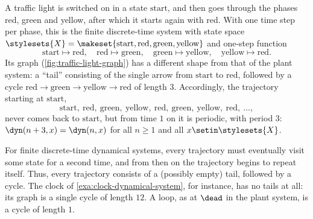 \begin{example}
    \label{exa:traffic-light}
    \begin{marginfigure}
        \centering
        \caption{The graph of the one-step function of the traffic light (\cref{exa:traffic-light}).}
        \label{fig:traffic-light-graph}
    \end{marginfigure}
    A traffic light is switched on in a state $\text{start}$, and then goes through the phases red, green and yellow, after which it starts again with red.
    With one time step per phase, this is the finite discrete-time system with state space $\stylesets{X} = \makeset{\text{start}, \text{red}, \text{green}, \text{yellow}}$ and one-step function
    \begin{equation}
        \text{start} \mapsto \text{red}, \quad \text{red} \mapsto \text{green}, \quad \text{green} \mapsto \text{yellow}, \quad \text{yellow} \mapsto \text{red}.
    \end{equation}
    Its graph (\cref{fig:traffic-light-graph}) has a different shape from that of the plant system: a ``tail'' consisting of the single arrow from $\text{start}$ to $\text{red}$, followed by a cycle $\text{red} \to \text{green} \to \text{yellow} \to \text{red}$ of length $3$.
    Accordingly, the trajectory starting at $\text{start}$,
    \begin{equation}
        \text{start}, \ \text{red}, \ \text{green}, \ \text{yellow}, \ \text{red}, \ \text{green}, \ \text{yellow}, \ \text{red}, \ \dots,
    \end{equation}
    never comes back to $\text{start}$, but from time $1$ on it is periodic, with period $3$: $\dyn(n + 3, x) = \dyn(n, x)$ for all $n \geq 1$ and all $x \setin \stylesets{X}$.
\end{example}

For finite discrete-time dynamical systems, every trajectory must eventually visit some state for a second time, and from then on the trajectory begins to repeat itself. Thus, every trajectory consists of a (possibly empty) tail, followed by a cycle. The clock of \cref{exa:clock-dynamical-system}, for instance, has no tails at all: its graph is a single cycle of length $12$. A loop, as at $\dead$ in the plant system, is a cycle of length $1$.


